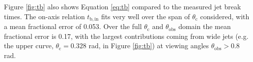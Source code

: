 \documentclass[twocolumn]{aastex62}
\newcommand{\tb}{\ensuremath{t_{\mathrm{b}}}}
\newcommand{\tbin}{\ensuremath{t_{\mathrm{b, in}}}}
\newcommand{\thobs}{\ensuremath{\theta_{\mathrm{obs}}}}
\newcommand{\thC}{\ensuremath{\theta_{\mathrm{c}}}}
\begin{document}
Figure \ref{fig:tb} also shows Equation \eqref{eq:tb} compared to the measured jet break times.  The on-axis relation $\tbin$ fits very well over the span of $\thC$ considered, with a mean fractional error of 0.053.  Over the full $\thC$ and $\thobs$ domain the mean fractional error is 0.17, with the largest contributions coming from wide jets (e.g. the upper curve, $\thC = 0.328$ rad, in Figure \ref{fig:tb}) at viewing angles $\thobs > 0.8$ rad.


\end{document}
